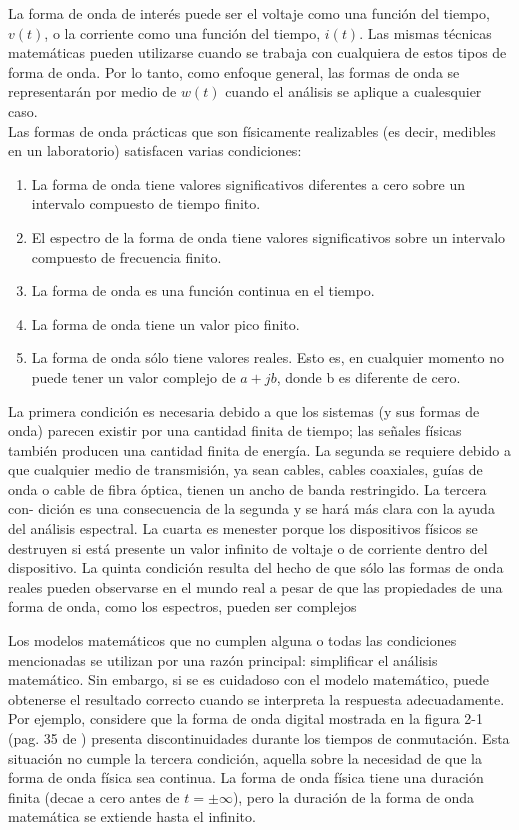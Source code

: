 La forma de onda de interés puede ser el voltaje como una función del tiempo, $v(t)$, 
o la corriente como una función del tiempo, $i(t)$. Las mismas técnicas matemáticas 
pueden utilizarse cuando se trabaja con cualquiera de estos tipos de forma de onda. Por 
lo tanto, como enfoque general, las formas de onda se representarán por medio de $w(t)$ 
cuando el análisis se aplique a cualesquier caso.
\eject
{}\\
Las formas de onda prácticas que son físicamente realizables (es decir, medibles en un laboratorio)
satisfacen varias condiciones:
\begin{enumerate}
\item La forma de onda tiene valores significativos diferentes a cero sobre un intervalo compuesto
de tiempo f\/inito.
\item El espectro de la forma de onda tiene valores significativos sobre un intervalo compuesto de
frecuencia f\/inito.
\item La forma de onda es una función continua en el tiempo.
\item La forma de onda tiene un valor pico f\/inito.
\item La forma de onda sólo tiene valores reales. Esto es, en cualquier momento no puede tener un
valor complejo de $a + jb$, donde b es diferente de cero.
\end{enumerate}
La primera condición es necesaria debido a que los sistemas (y sus formas de onda) parecen
existir por una cantidad finita de tiempo; las señales físicas también producen una cantidad finita de
energía. La segunda se requiere debido a que cualquier medio de transmisión, ya sean cables, cables
coaxiales, guías de onda o cable de fibra óptica, tienen un ancho de banda restringido. La tercera con-
dición es una consecuencia de la segunda y se hará más clara con la ayuda del análisis espectral. 
La cuarta es menester porque los dispositivos físicos se destruyen si
está presente un valor infinito de voltaje o de corriente dentro del dispositivo. La quinta condición
resulta del hecho de que sólo las formas de onda reales pueden observarse en el mundo real a pesar
de que las propiedades de una forma de onda, como los espectros, pueden ser complejos

Los modelos matemáticos que no cumplen alguna o todas las condiciones mencionadas se utilizan por 
una razón principal: simplificar el análisis ma\-te\-má\-ti\-co. Sin embargo, si se es cuidadoso
con el modelo matemático, puede obtenerse el resultado correcto cuando se interpreta la respuesta
adecuadamente.
Por ejemplo, considere que la forma de onda digital mostrada en la figura 2-1 (pag. 35 de 
\cite{Couch}) presenta discontinuidades durante los tiempos de conmutación. Esta situación no 
cumple la tercera condición, aquella sobre la necesidad de que la forma de onda física sea continua. 
La forma de onda física tiene una duración finita (decae a cero antes de $t = \pm\infty$), pero 
la duración de la forma de onda matemática se extiende hasta el infinito.

